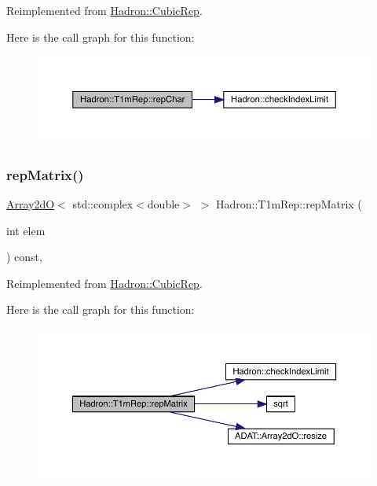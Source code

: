 Reimplemented from \mbox{\hyperlink{structHadron_1_1CubicRep_af45227106e8e715e84b0af69cd3b36f8}{Hadron\+::\+Cubic\+Rep}}.

Here is the call graph for this function\+:
\nopagebreak
\begin{figure}[H]
\begin{center}
\leavevmode
\includegraphics[width=350pt]{de/dd9/structHadron_1_1T1mRep_a3605cd47c3e2c6eb4d6982fafa0a1b89_cgraph}
\end{center}
\end{figure}
\mbox{\label{structHadron_1_1T1mRep_a77a8ee94e1ed9406845c8d1106f73599}} 
\subsubsection{\texorpdfstring{repMatrix()}{repMatrix()}\hspace{0.1cm}{\footnotesize\ttfamily [1/2]}}
{\footnotesize\ttfamily \mbox{\hyperlink{classADAT_1_1Array2dO}{Array2dO}}$<$ std\+::complex$<$double$>$ $>$ Hadron\+::\+T1m\+Rep\+::rep\+Matrix (\begin{DoxyParamCaption}\item[{int}]{elem }\end{DoxyParamCaption}) const\hspace{0.3cm}{\ttfamily [inline]}, {\ttfamily [virtual]}}



Reimplemented from \mbox{\hyperlink{structHadron_1_1CubicRep_ac5d7e9e6f4ab1158b5fce3e4ad9e8005}{Hadron\+::\+Cubic\+Rep}}.

Here is the call graph for this function\+:
\nopagebreak
\begin{figure}[H]
\begin{center}
\leavevmode
\includegraphics[width=350pt]{de/dd9/structHadron_1_1T1mRep_a77a8ee94e1ed9406845c8d1106f73599_cgraph}
\end{center}
\end{figure}
\mbox{\label{structHadron_1_1T1mRep_a77a8ee94e1ed9406845c8d1106f73599}} 
